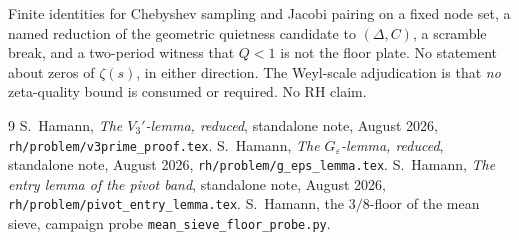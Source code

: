 \documentclass[11pt]{article}
\theoremstyle{remark}
\begin{document}
Finite identities for Chebyshev sampling and Jacobi pairing on
a fixed node set, a named reduction of the geometric
quietness candidate to $(\Delta,C)$, a scramble break, and a
two-period witness that $Q<1$ is not the floor plate.
No statement about zeros of $\zeta(s)$, in either direction.
The Weyl-scale adjudication is that \emph{no} zeta-quality
bound is consumed or required.
No RH claim.

\begin{thebibliography}{9}
S.~Hamann,
\textit{The $V_3'$-lemma, reduced},
standalone note, August 2026,
\texttt{rh/problem/v3prime\_proof.tex}.
S.~Hamann,
\textit{The $G_\varepsilon$-lemma, reduced},
standalone note, August 2026,
\texttt{rh/problem/g\_eps\_lemma.tex}.
S.~Hamann,
\textit{The entry lemma of the pivot band},
standalone note, August 2026,
\texttt{rh/problem/pivot\_entry\_lemma.tex}.
S.~Hamann,
the $3/8$-floor of the mean sieve,
campaign probe \texttt{mean\_sieve\_floor\_probe.py}.
\end{thebibliography}
\end{document}

